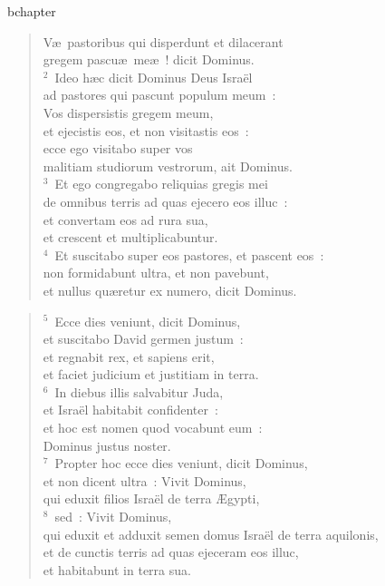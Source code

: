 bchapter\begin{verse}\vspace{-19pt}V\ae\ pastoribus qui disperdunt et dilacerant\\ gregem pascu\ae\ me\ae~! dicit Dominus.\\
${}^{2}$~Ideo h\ae c dicit Dominus Deus Isra\"el\\ ad pastores qui pascunt populum meum~:\\ Vos dispersistis gregem meum,\\ et ejecistis eos, et non visitastis eos~:\\ ecce ego visitabo super vos\\ malitiam studiorum vestrorum, ait Dominus.\\
${}^{3}$~Et ego congregabo reliquias gregis mei\\ de omnibus terris ad quas ejecero eos illuc~:\\ et convertam eos ad rura sua,\\ et crescent et multiplicabuntur.\\
${}^{4}$~Et suscitabo super eos pastores, et pascent eos~:\\ non formidabunt ultra, et non pavebunt,\\ et nullus qu\ae retur ex numero, dicit Dominus.\end{verse}


\begin{verse}${}^{5}$~Ecce dies veniunt, dicit Dominus,\\ et suscitabo David germen justum~:\\ et regnabit rex, et sapiens erit,\\ et faciet judicium et justitiam in terra.\\
${}^{6}$~In diebus illis salvabitur Juda,\\ et Isra\"el habitabit confidenter~:\\ et hoc est nomen quod vocabunt eum~:\\ Dominus justus noster.\\
${}^{7}$~Propter hoc ecce dies veniunt, dicit Dominus,\\ et non dicent ultra~: Vivit Dominus,\\ qui eduxit filios Isra\"el de terra \AE gypti,\\
${}^{8}$~sed~: Vivit Dominus,\\ qui eduxit et adduxit semen domus Isra\"el de terra aquilonis,\\ et de cunctis terris ad quas ejeceram eos illuc,\\ et habitabunt in terra sua.\end{verse}


